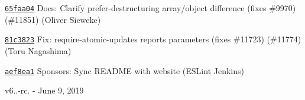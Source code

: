 \begin{DoxyItemize}
\item \href{https://github.com/eslint/eslint/commit/65faa04e8b42eecd4505111bbff296951179f033}{\texttt{ {\ttfamily 65faa04}}} Docs\+: Clarify prefer-\/destructuring array/object difference (fixes \#9970) (\#11851) (Oliver Sieweke)
\item \href{https://github.com/eslint/eslint/commit/81c382378923a45015bafe58362f6c8faa5c3d5f}{\texttt{ {\ttfamily 81c3823}}} Fix\+: require-\/atomic-\/updates reports parameters (fixes \#11723) (\#11774) (Toru Nagashima)
\item \href{https://github.com/eslint/eslint/commit/aef8ea1a44b9f13d468f48536c4c93f79f201d9b}{\texttt{ {\ttfamily aef8ea1}}} Sponsors\+: Sync R\+E\+A\+D\+ME with website (E\+S\+Lint Jenkins)
\end{DoxyItemize}

v6..-\/rc. -\/ June 9, 2019


